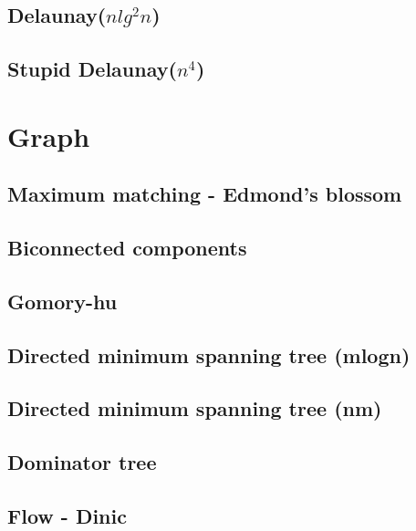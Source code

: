 \subsection{Delaunay($nlg^2n$)}
\raggedbottom
\hrulefill
\subsection{Stupid Delaunay($n^4$)}
\raggedbottom
\hrulefill

\section{Graph}
\subsection{Maximum matching - Edmond's blossom}
\raggedbottom
\hrulefill
\subsection{Biconnected components}
\raggedbottom
\hrulefill
\subsection{Gomory-hu}
\raggedbottom
\hrulefill
\subsection{Directed minimum spanning tree (mlogn)}
\raggedbottom
\hrulefill
\subsection{Directed minimum spanning tree (nm)}
\raggedbottom
\hrulefill
\subsection{Dominator tree}
\raggedbottom
\hrulefill
\subsection{Flow - Dinic}
\raggedbottom
\hrulefill
